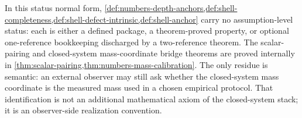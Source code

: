\begin{remark}
In this status normal form,
\cref{def:numbers-depth-anchors,def:shell-completeness,def:shell-defect-intrinsic,def:shell-anchor}
carry no assumption-level status: each is either a defined package,
a theorem-proved property, or optional one-reference bookkeeping discharged by
a two-reference theorem.  The scalar-pairing and closed-system
mass-coordinate bridge theorems are proved internally in
\cref{thm:scalar-pairing,thm:numbers-mass-calibration}.
The only residue is semantic: an external observer may still ask whether the
closed-system mass coordinate is the measured mass used in a chosen empirical
protocol.  That identification is not an additional mathematical axiom of the
closed-system stack; it is an observer-side realization convention.
\end{remark}

\begin{chapterclosing}
\end{chapterclosing}
